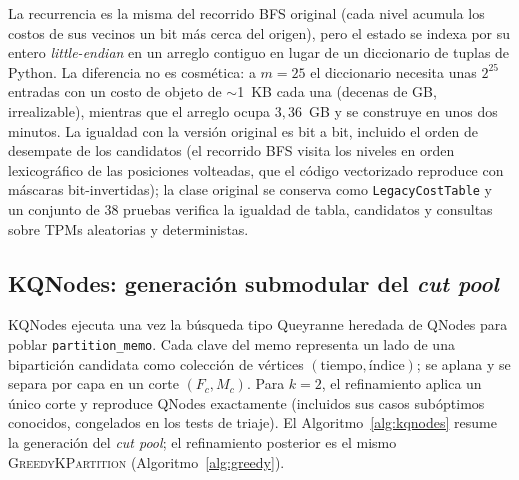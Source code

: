 \documentclass[11pt,letterpaper]{article}
\begin{document}
La recurrencia es la misma del recorrido BFS original (cada nivel acumula los
costos de sus vecinos un bit más cerca del origen), pero el estado se indexa por
su entero \emph{little-endian} en un arreglo contiguo en lugar de un diccionario
de tuplas de Python. La diferencia no es cosmética: a $m=25$ el diccionario
necesita unas $2^{25}$ entradas con un costo de objeto de $\sim$1~KB cada una
(decenas de GB, irrealizable), mientras que el arreglo ocupa $3{,}36$~GB y se
construye en unos dos minutos. La igualdad con la versión original es bit a bit,
incluido el orden de desempate de los candidatos (el recorrido BFS visita los
niveles en orden lexicográfico de las posiciones volteadas, que el código
vectorizado reproduce con máscaras bit-invertidas); la clase original se
conserva como \texttt{LegacyCostTable} y un conjunto de 38 pruebas verifica la
igualdad de tabla, candidatos y consultas sobre TPMs aleatorias y deterministas.

\subsection{KQNodes: generación submodular del \emph{cut pool}}
KQNodes ejecuta una vez la búsqueda tipo Queyranne heredada de QNodes para poblar
\texttt{partition\_memo}. Cada clave del memo representa un lado de una bipartición
candidata como colección de vértices $(\text{tiempo},\text{índice})$; se aplana y
se separa por capa en un corte $(F_c, M_c)$. Para $k=2$, el refinamiento aplica un
único corte y reproduce QNodes exactamente (incluidos sus casos subóptimos
conocidos, congelados en los tests de triaje). El Algoritmo~\ref{alg:kqnodes} resume
la generación del \emph{cut pool}; el refinamiento posterior es el mismo
\textsc{GreedyKPartition} (Algoritmo~\ref{alg:greedy}).
\end{document}

